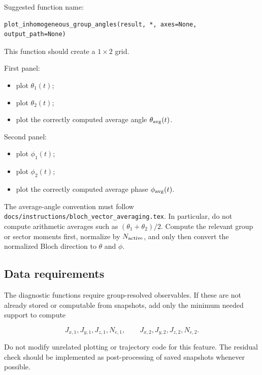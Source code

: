 \documentclass[11pt]{article}
\begin{document}
Suggested function name:

\begin{verbatim}
plot_inhomogeneous_group_angles(result, *, axes=None, output_path=None)
\end{verbatim}

This function should create a \(1\times2\) grid.

First panel:

\begin{itemize}
\item plot \(\theta_1(t)\);
\item plot \(\theta_2(t)\);
\item plot the correctly computed average angle \(\theta_{\rm avg}(t)\).
\end{itemize}

Second panel:

\begin{itemize}
\item plot \(\phi_1(t)\);
\item plot \(\phi_2(t)\);
\item plot the correctly computed average phase \(\phi_{\rm avg}(t)\).
\end{itemize}

The average-angle convention must follow
\texttt{docs/instructions/bloch\_vector\_averaging.tex}. In particular, do not
compute arithmetic averages such as \((\theta_1+\theta_2)/2\). Compute the
relevant group or sector moments first, normalize by \(N_{\rm active}\), and
only then convert the normalized Bloch direction to \(\theta\) and \(\phi\).

\subsection*{Data requirements}

The diagnostic functions require group-resolved observables. If these are not
already stored or computable from snapshots, add only the minimum needed support
to compute

\begin{equation}
J_{x,1},J_{y,1},J_{z,1},N_{e,1},
\qquad
J_{x,2},J_{y,2},J_{z,2},N_{e,2}.
\end{equation}

Do not modify unrelated plotting or trajectory code for this feature. The
residual check should be implemented as post-processing of saved snapshots
whenever possible.
\end{document}
